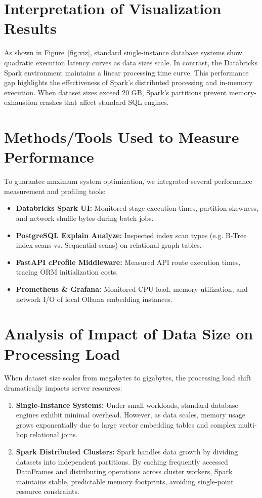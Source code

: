 \documentclass[12pt]{report}
\begin{document}
\section{Interpretation of Visualization Results}
As shown in Figure~\ref{fig:viz}, standard single-instance database systems show quadratic execution latency curves as data sizes scale. In contrast, the Databricks Spark environment maintains a linear processing time curve. This performance gap highlights the effectiveness of Spark's distributed processing and in-memory execution. When dataset sizes exceed 20 GB, Spark's partitions prevent memory-exhaustion crashes that affect standard SQL engines.

\section{Methods/Tools Used to Measure Performance}
To guarantee maximum system optimization, we integrated several performance measurement and profiling tools:
\begin{itemize}
    \item \textbf{Databricks Spark UI:} Monitored stage execution times, partition skewness, and network shuffle bytes during batch jobs.
    \item \textbf{PostgreSQL Explain Analyze:} Inspected index scan types (e.g. B-Tree index scans vs. Sequential scans) on relational graph tables.
    \item \textbf{FastAPI cProfile Middleware:} Measured API route execution times, tracing ORM initialization costs.
    \item \textbf{Prometheus \& Grafana:} Monitored CPU load, memory utilization, and network I/O of local Ollama embedding instances.
\end{itemize}

\section{Analysis of Impact of Data Size on Processing Load}
When dataset size scales from megabytes to gigabytes, the processing load shift dramatically impacts server resources:
\begin{enumerate}
    \item \textbf{Single-Instance Systems:} Under small workloads, standard database engines exhibit minimal overhead. However, as data scales, memory usage grows exponentially due to large vector embedding tables and complex multi-hop relational joins.
    \item \textbf{Spark Distributed Clusters:} Spark handles data growth by dividing datasets into independent partitions. By caching frequently accessed DataFrames and distributing operations across cluster workers, Spark maintains stable, predictable memory footprints, avoiding single-point resource constraints.
\end{enumerate}
\end{document}
